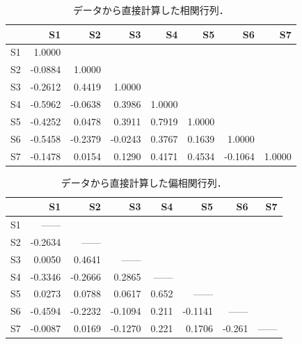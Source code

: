 \documentclass[11pt,dvipdfmx]{jarticle}
\theoremstyle{definition}
\begin{document}
\begin{table}[htbp]
\caption{データから直接計算した相関行列．}
\label{table:cor}
\begin{center}
{\small
 \begin{tabular}{|c|rrrrrrr|}
  \hline
  & S1 & S2 & S3 & S4 & S5 & S6 & S7 \\
  \hline
  S1	& 1.0000 & & & & & & \\
  S2	& -0.0884 &	1.0000 & & & & & \\
  S3	& -0.2612 &	0.4419 & 1.0000 & & & &\\
  S4	& -0.5962 & -0.0638	& 0.3986 & 1.0000 & & &\\ 
  S5	& -0.4252 &	0.0478 & 0.3911 & 0.7919 & 1.0000 & &\\ 
  S6	& -0.5458 &	-0.2379	& -0.0243 &	0.3767 & 0.1639 & 1.0000 & \\
  S7	& -0.1478 &	0.0154 & 0.1290	& 0.4171 & 0.4534 &	-0.1064 & 1.0000 \\
  \hline
 \end{tabular}
}
\end{center}
\end{table}

\begin{table}[htbp]
    \caption{データから直接計算した偏相関行列．}
    \label{table:par}
    \begin{center}
        {\small
            \begin{tabular}{|c|rrrrrrr|}
                \hline
                & S1 & S2 & S3 & S4 & S5 & S6 & S7 \\
                \hline
                S1	& ------ & & & & & & \\
                S2	& -0.2634 &	------ & & & & & \\
                S3	& 0.0050	& 0.4641 &	------ & & & & \\
                S4	& -0.3346	& -0.2666 &	0.2865 &	------ & & & \\
                S5	& 0.0273	& 0.0788 &	0.0617 &	0.652 &	------ & & \\
                S6	& -0.4594	& -0.2232 & -0.1094 &	0.211 &	-0.1141 &	------ & \\
                S7	& -0.0087	& 0.0169 &	-0.1270 &	0.221 &	0.1706 &	-0.261 &	------ \\
                \hline
            \end{tabular}
        }
    \end{center}
\end{table}
\end{document}
